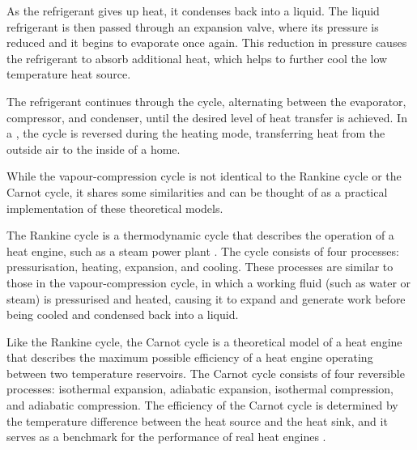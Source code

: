 As the refrigerant gives up heat, it condenses back into a liquid. The liquid refrigerant is then passed through an expansion valve, where its pressure is reduced and it begins to evaporate once again. This reduction in pressure causes the refrigerant to absorb additional heat, which helps to further cool the low temperature heat source.

The refrigerant continues through the cycle, alternating between the evaporator, compressor, and condenser, until the desired level of heat transfer is achieved. In a \HP, the cycle is reversed during the heating mode, transferring heat from the outside air to the inside of a home.

While the vapour-compression cycle is not identical to the Rankine cycle or the Carnot cycle, it shares some similarities and can be thought of as a practical implementation of these theoretical models.

The Rankine cycle is a thermodynamic cycle that describes the operation of a heat engine, such as a steam power plant \cite{cengel_thermo_2020}. The cycle consists of four processes: pressurisation, heating, expansion, and cooling. These processes are similar to those in the vapour-compression cycle, in which a working fluid (such as water or steam) is pressurised and heated, causing it to expand and generate work before being cooled and condensed back into a liquid. 

Like the Rankine cycle, the Carnot cycle is a theoretical model of a heat engine that describes the maximum possible efficiency of a heat engine operating between two temperature reservoirs. The Carnot cycle consists of four reversible processes: isothermal expansion, adiabatic expansion, isothermal compression, and adiabatic compression. The efficiency of the Carnot cycle is determined by the temperature difference between the heat source and the heat sink, and it serves as a benchmark for the performance of real heat engines \cite{cengel_thermo_2020}.


